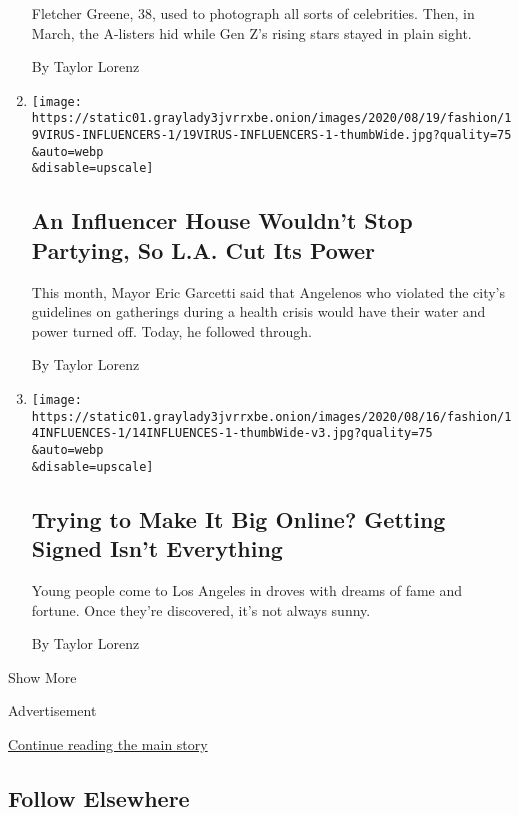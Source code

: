 \begin{enumerate}
  Fletcher Greene, 38, used to photograph all sorts of celebrities.
  Then, in March, the A-listers hid while Gen Z's rising stars stayed in
  plain sight.

  By Taylor Lorenz
\item
  \href{/2020/08/19/style/la-party-power-cut-tiktok.html}{}

  \texttt{[image: https://static01.graylady3jvrrxbe.onion/images/2020/08/19/fashion/19VIRUS-INFLUENCERS-1/19VIRUS-INFLUENCERS-1-thumbWide.jpg?quality=75\\\&auto=webp\\\&disable=upscale]}

  \hypertarget{an-influencer-house-wouldnt-stop-partying-so-la-cut-its-power}{%
  \subsection{An Influencer House Wouldn't Stop Partying, So L.A. Cut
  Its
  Power}\label{an-influencer-house-wouldnt-stop-partying-so-la-cut-its-power}}

  This month, Mayor Eric Garcetti said that Angelenos who violated the
  city's guidelines on gatherings during a health crisis would have
  their water and power turned off. Today, he followed through.

  By Taylor Lorenz
\item
  \href{/2020/08/14/style/influences-tiktok-management-brittany-broski.html}{}

  \texttt{[image: https://static01.graylady3jvrrxbe.onion/images/2020/08/16/fashion/14INFLUENCES-1/14INFLUENCES-1-thumbWide-v3.jpg?quality=75\\\&auto=webp\\\&disable=upscale]}

  \hypertarget{trying-to-make-it-big-online-getting-signed-isnt-everything}{%
  \subsection{Trying to Make It Big Online? Getting Signed Isn't
  Everything}\label{trying-to-make-it-big-online-getting-signed-isnt-everything}}

  Young people come to Los Angeles in droves with dreams of fame and
  fortune. Once they're discovered, it's not always sunny.

  By Taylor Lorenz
\end{enumerate}

Show More

Advertisement

\protect\hyperlink{after-mid2}{Continue reading the main story}

\hypertarget{follow-elsewhere}{%
\subsection{Follow Elsewhere}\label{follow-elsewhere}}

